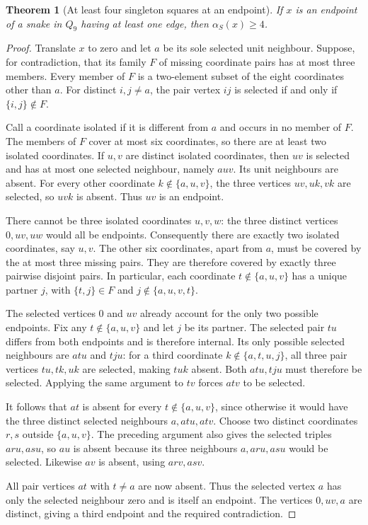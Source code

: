 \documentclass[11pt,a4paper]{article}
\newtheorem{theorem}{Theorem}[section]
\theoremstyle{definition}
\theoremstyle{remark}
\newcommand{\Q}{Q}
\begin{document}
\begin{theorem}[At least four singleton squares at an endpoint]\label{thm:endpoint-four}
If $x$ is an endpoint of a snake in $\Q_9$ having at least one edge, then $\alpha_S(x)\ge4$.
\end{theorem}
\begin{proof}
Translate $x$ to zero and let $a$ be its sole selected unit neighbour. Suppose, for contradiction, that its family $F$ of missing coordinate pairs has at most three members. Every member of $F$ is a two-element subset of the eight coordinates other than $a$. For distinct $i,j\ne a$, the pair vertex $ij$ is selected if and only if $\{i,j\}\notin F$.

Call a coordinate isolated if it is different from $a$ and occurs in no member of $F$. The members of $F$ cover at most six coordinates, so there are at least two isolated coordinates. If $u,v$ are distinct isolated coordinates, then $uv$ is selected and has at most one selected neighbour, namely $auv$. Its unit neighbours are absent. For every other coordinate $k\notin\{a,u,v\}$, the three vertices $uv,uk,vk$ are selected, so $uvk$ is absent. Thus $uv$ is an endpoint.

There cannot be three isolated coordinates $u,v,w$: the three distinct vertices $0,uv,uw$ would all be endpoints. Consequently there are exactly two isolated coordinates, say $u,v$. The other six coordinates, apart from $a$, must be covered by the at most three missing pairs. They are therefore covered by exactly three pairwise disjoint pairs. In particular, each coordinate $t\notin\{a,u,v\}$ has a unique partner $j$, with $\{t,j\}\in F$ and $j\notin\{a,u,v,t\}$.

The selected vertices $0$ and $uv$ already account for the only two possible endpoints. Fix any $t\notin\{a,u,v\}$ and let $j$ be its partner. The selected pair $tu$ differs from both endpoints and is therefore internal. Its only possible selected neighbours are $atu$ and $tju$: for a third coordinate $k\notin\{a,t,u,j\}$, all three pair vertices $tu,tk,uk$ are selected, making $tuk$ absent. Both $atu,tju$ must therefore be selected. Applying the same argument to $tv$ forces $atv$ to be selected.

It follows that $at$ is absent for every $t\notin\{a,u,v\}$, since otherwise it would have the three distinct selected neighbours $a,atu,atv$. Choose two distinct coordinates $r,s$ outside $\{a,u,v\}$. The preceding argument also gives the selected triples $aru,asu$, so $au$ is absent because its three neighbours $a,aru,asu$ would be selected. Likewise $av$ is absent, using $arv,asv$.

All pair vertices $at$ with $t\ne a$ are now absent. Thus the selected vertex $a$ has only the selected neighbour zero and is itself an endpoint. The vertices $0,uv,a$ are distinct, giving a third endpoint and the required contradiction.
\end{proof}
\end{document}
